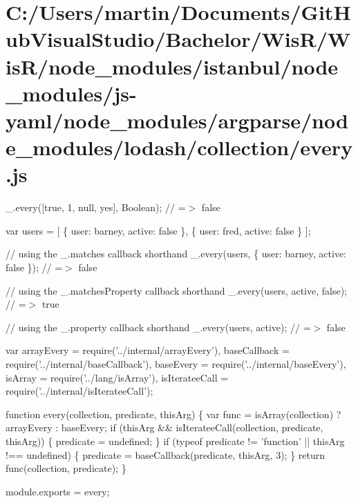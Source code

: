 \hypertarget{_c_1_2_users_2martin_2_documents_2_git_hub_visual_studio_2_bachelor_2_wis_r_2_wis_r_2node_module8343757c37237c068cb9cbddf7c21f3a}{}\section{C\+:/\+Users/martin/\+Documents/\+Git\+Hub\+Visual\+Studio/\+Bachelor/\+Wis\+R/\+Wis\+R/node\+\_\+modules/istanbul/node\+\_\+modules/js-\/yaml/node\+\_\+modules/argparse/node\+\_\+modules/lodash/collection/every.\+js}
\+\_\+.\+every(\mbox{[}true, 1, null, \textquotesingle{}yes\textquotesingle{}\mbox{]}, Boolean); // =$>$ false

var users = \mbox{[} \{ \textquotesingle{}user\textquotesingle{}\+: \textquotesingle{}barney\textquotesingle{}, \textquotesingle{}active\textquotesingle{}\+: false \}, \{ \textquotesingle{}user\textquotesingle{}\+: \textquotesingle{}fred\textquotesingle{}, \textquotesingle{}active\textquotesingle{}\+: false \} \mbox{]};

// using the {\ttfamily \+\_\+.\+matches} callback shorthand \+\_\+.\+every(users, \{ \textquotesingle{}user\textquotesingle{}\+: \textquotesingle{}barney\textquotesingle{}, \textquotesingle{}active\textquotesingle{}\+: false \}); // =$>$ false

// using the {\ttfamily \+\_\+.\+matches\+Property} callback shorthand \+\_\+.\+every(users, \textquotesingle{}active\textquotesingle{}, false); // =$>$ true

// using the {\ttfamily \+\_\+.\+property} callback shorthand \+\_\+.\+every(users, \textquotesingle{}active\textquotesingle{}); // =$>$ false


\begin{DoxyCodeInclude}
var arrayEvery = require(\textcolor{stringliteral}{'../internal/arrayEvery'}),
    baseCallback = require(\textcolor{stringliteral}{'../internal/baseCallback'}),
    baseEvery = require(\textcolor{stringliteral}{'../internal/baseEvery'}),
    isArray = require(\textcolor{stringliteral}{'../lang/isArray'}),
    isIterateeCall = require(\textcolor{stringliteral}{'../internal/isIterateeCall'});

\textcolor{keyword}{function} every(collection, predicate, thisArg) \{
  var func = isArray(collection) ? arrayEvery : baseEvery;
  \textcolor{keywordflow}{if} (thisArg && isIterateeCall(collection, predicate, thisArg)) \{
    predicate = undefined;
  \}
  \textcolor{keywordflow}{if} (typeof predicate != \textcolor{stringliteral}{'function'} || thisArg !== undefined) \{
    predicate = baseCallback(predicate, thisArg, 3);
  \}
  \textcolor{keywordflow}{return} func(collection, predicate);
\}

module.exports = every;
\end{DoxyCodeInclude}
 